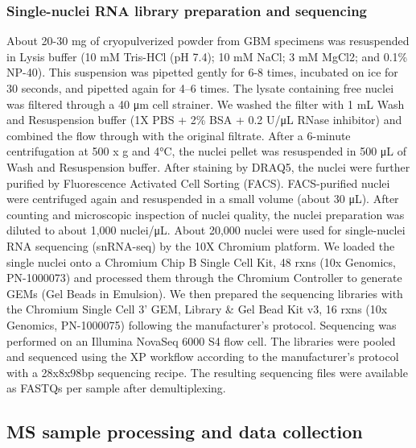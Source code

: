 \subsubsection{Single-nuclei RNA library preparation and sequencing}
About 20-30 mg of cryopulverized powder from GBM specimens was resuspended in Lysis buffer (10 mM Tris-HCl (pH 7.4); 10 mM NaCl; 3 mM MgCl2; and 0.1\% NP-40). This suspension was pipetted gently for 6-8 times, incubated on ice for 30 seconds, and pipetted again for 4--6 times. The lysate containing free nuclei was filtered through a 40 μm cell strainer. We washed the filter with 1 mL Wash and Resuspension buffer (1X PBS + 2\% BSA + 0.2 U/μL RNase inhibitor) and combined the flow through with the original filtrate. After a 6-minute centrifugation at 500 x g and 4°C, the nuclei pellet was resuspended in 500 μL of Wash and Resuspension buffer. After staining by DRAQ5, the nuclei were further purified by Fluorescence Activated Cell Sorting (FACS). FACS-purified nuclei were centrifuged again and resuspended in a small volume (about 30 μL). After counting and microscopic inspection of nuclei quality, the nuclei preparation was diluted to about 1,000 nuclei/μL. About 20,000 nuclei were used for single-nuclei RNA sequencing (snRNA-seq) by the 10X Chromium platform. We loaded the single nuclei onto a Chromium Chip B Single Cell Kit, 48 rxns (10x Genomics, PN-1000073) and processed them through the Chromium Controller to generate GEMs (Gel Beads in Emulsion). We then prepared the sequencing libraries with the Chromium Single Cell 3' GEM, Library \& Gel Bead Kit v3, 16 rxns (10x Genomics, PN-1000075) following the manufacturer’s protocol. Sequencing was performed on an Illumina NovaSeq 6000 S4 flow cell. The libraries were pooled and sequenced using the XP workflow according to the manufacturer's protocol with a 28x8x98bp sequencing recipe. The resulting sequencing files were available as FASTQs per sample after demultiplexing.


\subsection{MS sample processing and data collection}

